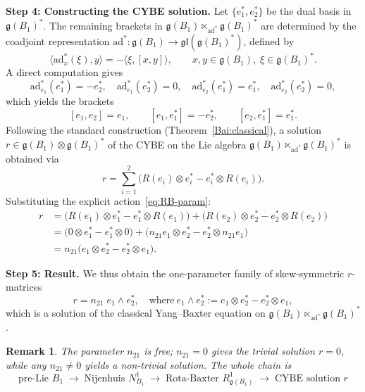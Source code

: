 \documentclass[12pt, reqno]{amsart}
\theoremstyle{plain}
\newtheorem{remark}[theorem]{Remark}
\begin{document}
\textbf{Step 4: Constructing the CYBE solution.}
Let $\{e_1^*, e_2^*\}$ be the dual basis in $\mathfrak{g}(B_1)^*$. The remaining brackets in $\mathfrak{g}(B_1) \ltimes_{\mathrm{ad}^*} \mathfrak{g}(B_1)^*$ are determined by the coadjoint representation $\mathrm{ad}^*: \mathfrak{g}(B_1) \to \mathfrak{gl}(\mathfrak{g}(B_1)^*)$, defined by  
\[
\langle \mathrm{ad}_x^*(\xi), y \rangle = -\langle \xi, [x, y] \rangle,\qquad x,y\in\mathfrak{g}(B_1),\; \xi\in\mathfrak{g}(B_1)^*.
\]  
A direct computation gives  
\[
\mathrm{ad}_{e_1}^*(e_1^*) = -e_2^*,\quad \mathrm{ad}_{e_1}^*(e_2^*) = 0,\quad \mathrm{ad}_{e_2}^*(e_1^*) = e_1^*,\quad \mathrm{ad}_{e_2}^*(e_2^*) = 0,
\]  
which yields the brackets  
\begin{equation}\label{eq:bracket-g1-double}
[e_1, e_2] = e_1,\qquad [e_1, e_1^*] = -e_2^*,\qquad [e_2, e_1^*] = e_1^*.
\end{equation}  
Following the standard construction (Theorem~\ref{Bai:classical}), a solution $r \in \mathfrak{g}(B_1) \otimes \mathfrak{g}(B_1)^*$ of the CYBE on the Lie algebra $\mathfrak{g}(B_1) \ltimes_{\mathrm{ad}^*} \mathfrak{g}(B_1)^*$ is obtained via  
\begin{equation}\label{eq:r-formula}
r = \sum_{i=1}^2 \bigl( R(e_i) \otimes e_i^* - e_i^* \otimes R(e_i) \bigr).
\end{equation}  
Substituting the explicit action~\eqref{eq:RB-param}:  
\begin{align*}
r &= \bigl( R(e_1) \otimes e_1^* - e_1^* \otimes R(e_1) \bigr) + \bigl( R(e_2) \otimes e_2^* - e_2^* \otimes R(e_2) \bigr) \\
&= \bigl( 0 \otimes e_1^* - e_1^* \otimes 0 \bigr) + \bigl( n_{21} e_1 \otimes e_2^* - e_2^* \otimes n_{21} e_1 \bigr) \\
&= n_{21} \bigl( e_1 \otimes e_2^* - e_2^* \otimes e_1 \bigr).
\end{align*}

\textbf{Step 5: Result.}
We thus obtain the one-parameter family of skew-symmetric $r$-matrices  
\begin{equation}\label{eq:r-explicit}  
r = n_{21} \; e_1 \wedge e_2^*,\quad \text{where}~e_1 \wedge e_2^* := e_1 \otimes e_2^* - e_2^* \otimes e_1,  
\end{equation}  
which is a solution of the classical Yang–Baxter equation on $\mathfrak{g}(B_1) \ltimes_{\mathrm{ad}^*} \mathfrak{g}(B_1)^*$.

\begin{remark}
The parameter $n_{21}$ is free; $n_{21}=0$ gives the trivial solution $r=0$, while any $n_{21}\neq 0$ yields a non‑trivial  solution. The whole chain is
    \[
    \text{pre‑Lie } B_1 \;\longrightarrow\; \text{Nijenhuis } N_{B_1}^1 \;\longrightarrow\; \text{Rota-Baxter } R_{\mathfrak{g}(B_1)}^1 \;\longrightarrow\; \text{CYBE solution } r
    \]
\end{remark}
\end{document}
